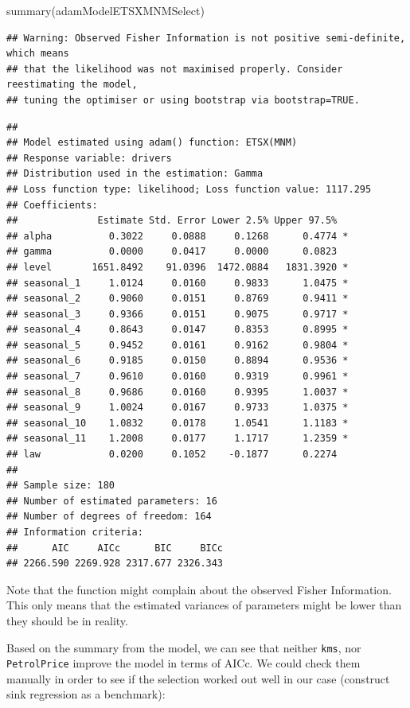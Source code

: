 \documentclass[
]{book}
\newenvironment{Shaded}{\begin{snugshade}}{\end{snugshade}}
\newcommand{\FunctionTok}[1]{\textcolor[rgb]{0.00,0.00,0.00}{#1}}
\newcommand{\NormalTok}[1]{#1}
\theoremstyle{definition}
\theoremstyle{definition}
\theoremstyle{definition}
\theoremstyle{definition}
\theoremstyle{remark}
\begin{document}
\begin{Shaded}
\begin{Highlighting}[]
\FunctionTok{summary}\NormalTok{(adamModelETSXMNMSelect)}
\end{Highlighting}
\end{Shaded}

\begin{verbatim}
## Warning: Observed Fisher Information is not positive semi-definite, which means
## that the likelihood was not maximised properly. Consider reestimating the model,
## tuning the optimiser or using bootstrap via bootstrap=TRUE.
\end{verbatim}

\begin{verbatim}
## 
## Model estimated using adam() function: ETSX(MNM)
## Response variable: drivers
## Distribution used in the estimation: Gamma
## Loss function type: likelihood; Loss function value: 1117.295
## Coefficients:
##              Estimate Std. Error Lower 2.5% Upper 97.5%  
## alpha          0.3022     0.0888     0.1268      0.4774 *
## gamma          0.0000     0.0417     0.0000      0.0823  
## level       1651.8492    91.0396  1472.0884   1831.3920 *
## seasonal_1     1.0124     0.0160     0.9833      1.0475 *
## seasonal_2     0.9060     0.0151     0.8769      0.9411 *
## seasonal_3     0.9366     0.0151     0.9075      0.9717 *
## seasonal_4     0.8643     0.0147     0.8353      0.8995 *
## seasonal_5     0.9452     0.0161     0.9162      0.9804 *
## seasonal_6     0.9185     0.0150     0.8894      0.9536 *
## seasonal_7     0.9610     0.0160     0.9319      0.9961 *
## seasonal_8     0.9686     0.0160     0.9395      1.0037 *
## seasonal_9     1.0024     0.0167     0.9733      1.0375 *
## seasonal_10    1.0832     0.0178     1.0541      1.1183 *
## seasonal_11    1.2008     0.0177     1.1717      1.2359 *
## law            0.0200     0.1052    -0.1877      0.2274  
## 
## Sample size: 180
## Number of estimated parameters: 16
## Number of degrees of freedom: 164
## Information criteria:
##      AIC     AICc      BIC     BICc 
## 2266.590 2269.928 2317.677 2326.343
\end{verbatim}

Note that the function might complain about the observed Fisher Information. This only means that the estimated variances of parameters might be lower than they should be in reality.

Based on the summary from the model, we can see that neither \texttt{kms}, nor \texttt{PetrolPrice} improve the model in terms of AICc. We could check them manually in order to see if the selection worked out well in our case (construct sink regression as a benchmark):
\end{document}
